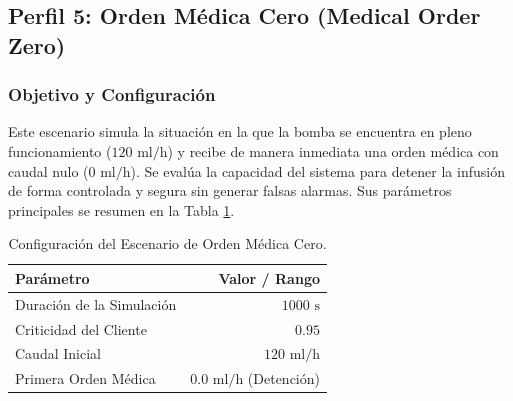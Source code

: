 \documentclass[11pt,a4paper]{article}
\begin{document}
\subsection{Perfil 5: Orden Médica Cero (Medical Order Zero)}
\subsubsection{Objetivo y Configuración}
Este escenario simula la situación en la que la bomba se encuentra en pleno funcionamiento ($120\text{ ml/h}$) y recibe de manera inmediata una orden médica con caudal nulo ($0\text{ ml/h}$). Se evalúa la capacidad del sistema para detener la infusión de forma controlada y segura sin generar falsas alarmas. Sus parámetros principales se resumen en la Tabla \ref{tab:config_orden_cero}.

\begin{table}[H]
    \centering
    \begin{tabular}{lr}
        \toprule
        \textbf{Parámetro} & \textbf{Valor / Rango} \\
        \midrule
        Duración de la Simulación & $1000\text{ s}$ \\
        Criticidad del Cliente & $0.95$ \\
        Caudal Inicial & $120\text{ ml/h}$ \\
        Primera Orden Médica & $0.0\text{ ml/h}$ (Detención) \\
        \bottomrule
    \end{tabular}
    \caption{Configuración del Escenario de Orden Médica Cero.}
    \label{tab:config_orden_cero}
\end{table}
\end{document}
